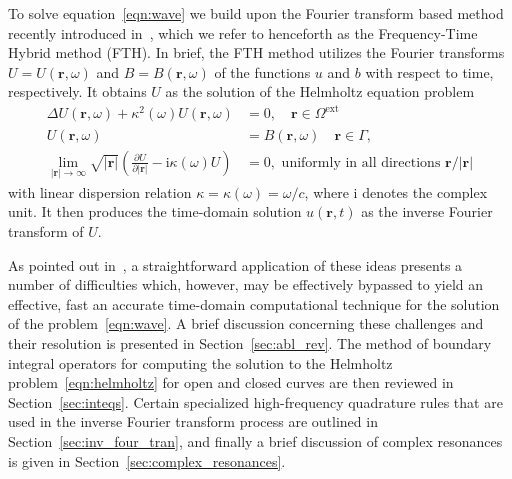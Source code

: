 \documentclass[11pt]{article}
\theoremstyle{plain}
\theoremstyle{remark}
\def \br{\mathbf{r}}
\begin{document}
To solve equation~\eqref{eqn:wave} we build upon the Fourier transform
based method recently introduced in~\cite{abl}, which we refer to
henceforth as the Frequency-Time Hybrid method (FTH). In brief, the FTH method utilizes the Fourier transforms $U = U(\br,\omega)$ and $B= B(\br,\omega)$ of the functions $u$
and $b$ with respect to time, respectively. It obtains $U$ as the solution of the Helmholtz equation problem 
\begin{subequations}\label{eqn:helmholtz}
    \begin{align}
    \Delta U(\br,\omega) + \kappa^2(\omega)U(\br,\omega) &= 0, \quad \br \in \Omega^\mathrm{ext}\label{eqn:helm_pde}\\
    U(\br,\omega)  &= B(\br,\omega) \quad \br \in \Gamma,\label{eqn:helm_bndc}\\
    \lim_{|\br| \to \infty}\sqrt{|\br|} \left(\frac{\partial U}{\partial |\br|} - \mathrm{i}\kappa(\omega)U\right) &= 0, \text{ uniformly in all directions } \br / |\br|
\end{align}
\end{subequations}
with linear dispersion relation $\kappa = \kappa(\omega) = \omega /c$,
where $\mathrm{i}$ denotes the complex unit. It then produces the
time-domain solution $u(\br,t)$ as the inverse Fourier transform of
$U$.

As pointed out in~\cite{abl}, a straightforward application of these
ideas presents a number of difficulties which, however, may be
effectively bypassed to yield an effective, fast an accurate
time-domain computational technique for the solution of the
problem~\eqref{eqn:wave}. A brief discussion concerning these
challenges and their resolution is presented in
Section~\ref{sec:abl_rev}. The method of boundary integral operators
for computing the solution to the Helmholtz
problem~\eqref{eqn:helmholtz} for open and closed curves are then
reviewed in Section~\ref{sec:inteqs}. Certain specialized
high-frequency quadrature rules that are used in the inverse Fourier
transform process are outlined in Section~\ref{sec:inv_four_tran}, and
finally a brief discussion of complex resonances is given in
Section~\ref{sec:complex_resonances}.
\end{document}
